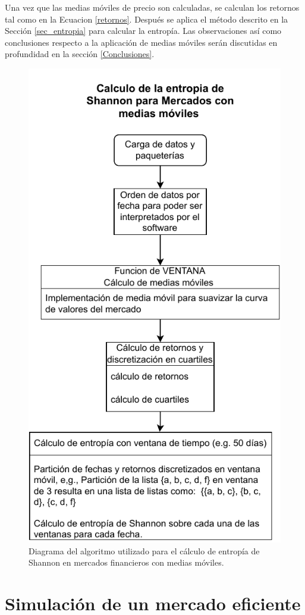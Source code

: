 Una vez que las medias móviles de precio son calculadas, se calculan los retornos tal como en la Ecuacion \ref{retornos}.
Después se aplica el método descrito en la Sección \ref{sec_entropia} para calcular la entropía.
Las observaciones así como conclusiones respecto a la aplicación de medias móviles serán discutidas en profundidad en la sección \ref{Conclusiones}.


\begin{figure}
	\centering
	\includegraphics[width=0.7\linewidth]{figures/entropiaMAV}
	\caption{Diagrama del algoritmo utilizado para el c\'alculo de entrop\'ia de Shannon en mercados financieros con medias m\'oviles.}
	\label{entropiamav}
\end{figure}



\section{Simulación de un mercado eficiente}


